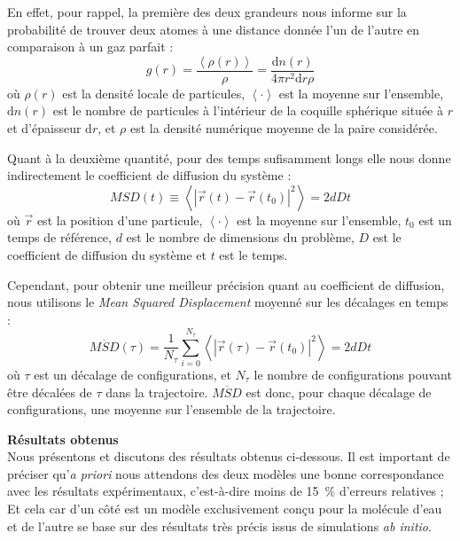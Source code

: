 En effet, pour rappel, la première des deux grandeurs nous informe sur la probabilité de trouver deux atomes à une distance donnée l'un de l'autre en comparaison à un gaz parfait :
\begin{equation}
    \boxed%
    {
        g (r) = \frac{\left\langle \rho (r) \right\rangle}{\rho} = \frac{\mathrm{d}n(r)}{4 \pi r^2 \mathrm{d}r \rho}
    }
    \label{eq:rdf}
\end{equation}
où $\rho (r)$ est la densité locale de particules, $\left\langle \cdot \right\rangle$ est la moyenne sur l'ensemble, $\mathrm{d}n(r)$ est le nombre de particules à l'intérieur de la coquille sphérique située à $r$ et d'épaisseur $\mathrm{d}r$, et $\rho$ est la densité numérique moyenne de la paire considérée.

Quant à la deuxième quantité, pour des temps sufisamment longs elle nous donne indirectement le coefficient de diffusion du système :
\begin{equation*}
    MSD(t) \equiv \left\langle \left| \vec{r}(t) - \vec{r}(t_0) \right|^2 \right\rangle = 2 d D t
\end{equation*}
où $\vec{r}$ est la position d'une particule, $\left\langle \cdot \right\rangle$ est la moyenne sur l'ensemble, $t_0$ est un temps de référence, $d$ est le nombre de dimensions du problème, $D$ est le coefficient de diffusion du système et $t$ est le temps.

Cependant, pour obtenir une meilleur précision quant au coefficient de diffusion, nous utilisons le \emph{Mean Squared Displacement} moyenné sur les décalages en temps :
\begin{equation}
    \boxed%
    {
        \overline{MSD} (\tau) = \frac{1}{N_{\tau}} \sum_{i = 0}^{N_{\tau}} \left\langle \left| \vec{r}(\tau) - \vec{r}(t_0) \right|^2 \right\rangle  = 2 d D t
    }
\end{equation}
où $\tau$ est un décalage de configurations, et $N_{\tau}$ le nombre de configurations pouvant être décalées de $\tau$ dans la trajectoire. $\overline{MSD}$ est donc, pour chaque décalage de configurations, une moyenne sur l'ensemble de la trajectoire.

\textbf{Résultats obtenus}\\
Nous présentons et discutons des résultats obtenus ci-dessous. Il est important de préciser qu'\textit{a priori} nous attendons des deux modèles une bonne correspondance avec les résultats expérimentaux, c'est-à-dire moins de \qty{15}{\percent} d'erreurs relatives ; Et cela car d'un côté \spce{} est un modèle exclusivement conçu pour la molécule d'eau et de l'autre \reaxff{} se base sur des résultats très précis issus de simulations \textit{ab initio}.

